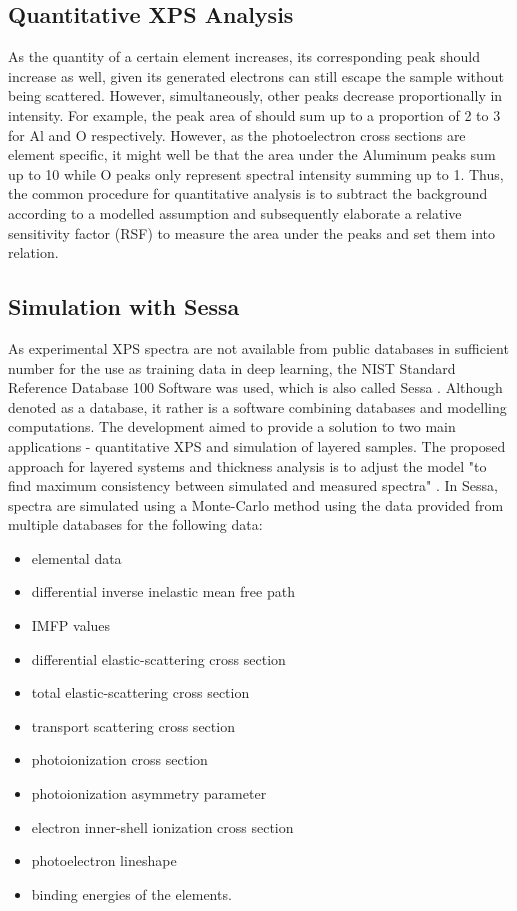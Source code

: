 \subsection{Quantitative XPS Analysis}
As the quantity of a certain element increases, its corresponding peak should increase as well, given its generated electrons can still escape the sample without being scattered. However, simultaneously, other peaks decrease proportionally in intensity. For example, the peak area of  should sum up to a proportion of 2 to 3 for Al and O respectively.
However, as the photoelectron cross sections are element specific, it might well be that the area under the Aluminum peaks sum up to 10 while O peaks only represent spectral intensity summing up to 1. Thus, the common procedure for quantitative analysis is to subtract the background according to a modelled assumption and subsequently elaborate a relative sensitivity factor (RSF) to measure the area under the peaks and set them into relation.

\subsection{Simulation with Sessa}
\label{subchap:sim_sessa}
As experimental XPS spectra are not available from public databases in sufficient number for the use as training data in deep learning, the NIST Standard Reference Database 100 Software was used, which is also called Sessa \cite{noauthor_nist_2010, smekal_simulation_2005}. Although denoted as a database, it rather is a software combining databases and modelling computations. The development aimed to provide a solution to two main applications - quantitative XPS and simulation of layered samples. The proposed approach for layered systems and thickness analysis is to adjust the model "to find maximum consistency between simulated and measured spectra" \cite{smekal_simulation_2005}.
In Sessa, spectra are simulated using a Monte-Carlo method using the data provided from multiple databases for the following data:

\begin{itemize}
    \item elemental data
    \item differential inverse inelastic mean free path
    \item IMFP values
    \item differential elastic-scattering cross section
    \item total elastic-scattering cross section
    \item transport scattering cross section
    \item photoionization cross section
    \item photoionization asymmetry parameter
    \item electron inner-shell ionization cross section
    \item photoelectron lineshape
    \item binding energies of the elements.
\end{itemize}

